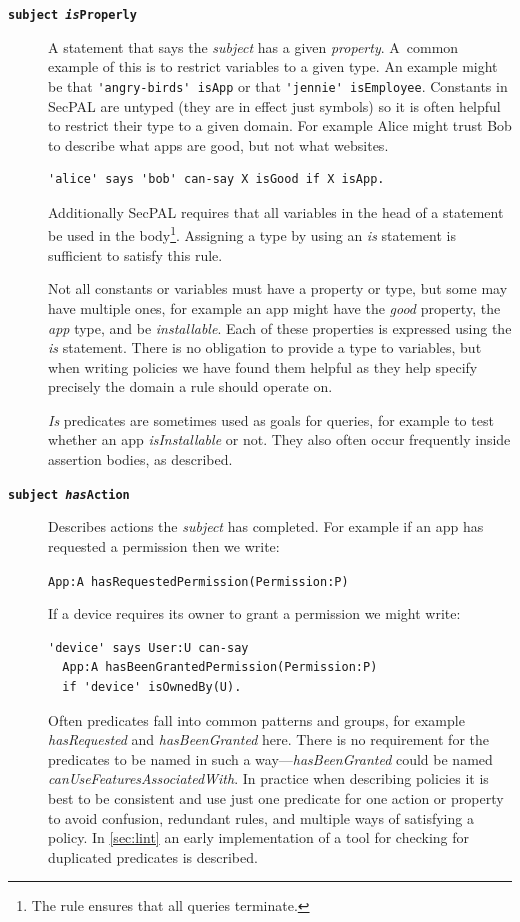 \documentclass[thesis.tex]{subfiles}
\begin{document}
\begin{description}
\item[\bfseries\texttt{subject \emph{is}Properly}]
  A statement that says the \emph{subject} has a given \emph{property}.
  A~common example of this is to restrict variables to a given type.
  An example might be that \lstinline!'angry-birds' isApp! or that \lstinline!'jennie' isEmployee!.
  Constants in SecPAL are untyped (they are in effect just symbols) so it is
  often helpful to restrict their type to a given domain.  For example Alice
  might trust Bob to describe what apps are good, but not what websites.
  \begin{lstlisting}
'alice' says 'bob' can-say X isGood if X isApp.
  \end{lstlisting}
  Additionally SecPAL requires that all variables in the head of a statement be
  used in the body\footnote{The rule ensures that all queries terminate.}.
  Assigning a type by using an \emph{is} statement is sufficient to satisfy this rule.

  Not all constants or variables must have a property or type, but some may have multiple
  ones, for example an app might have the \emph{good} property, the \emph{app}
  type, and be \emph{installable}.  Each of these properties is expressed using
  the \emph{is} statement.  There is no obligation to provide a type to
  variables, but when writing policies we have found them helpful as they help
  specify precisely the domain a rule should operate on.

  \emph{Is} predicates are sometimes used as goals for queries, for example to test whether
  an app \emph{isInstallable} or not.  They also often occur frequently inside
  assertion bodies, as described.

\item[\bfseries\texttt{subject \emph{has}Action}]
  Describes actions the \emph{subject} has completed.
  For example if an app has requested a permission then we write:

  \lstinline!App:A hasRequestedPermission(Permission:P)!

  If a device requires its owner to grant a permission we might write:
  \begin{lstlisting}
'device' says User:U can-say
  App:A hasBeenGrantedPermission(Permission:P)
  if 'device' isOwnedBy(U).
  \end{lstlisting}

  Often predicates fall into common patterns and groups, for example
  \emph{hasRequested} and \emph{hasBeenGranted} here.  There is no requirement
  for the predicates to be named in such a way---\emph{hasBeenGranted} could be
  named \emph{canUseFeaturesAssociatedWith}.  In practice when describing
  policies it is best to be consistent and use just one predicate for one action
  or property to avoid confusion, redundant rules, and multiple ways of
  satisfying a policy.  In \autoref{sec:lint} an early implementation of a tool
  for checking for duplicated predicates is described.


\end{description}
\end{document}
